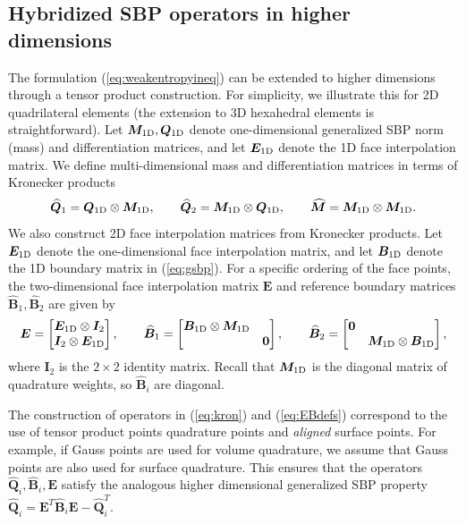 \documentclass{svjour3}                     %
\renewcommand{\hat}{\widehat}
\begin{document}
\subsection{Hybridized SBP operators in higher dimensions}

The formulation (\ref{eq:weakentropyineq}) can be extended to higher dimensions through a tensor product construction.  For simplicity, we illustrate this for 2D quadrilateral elements (the extension to 3D hexahedral elements is straightforward).  Let $\bm{M}_{\rm 1D}, \bm{Q}_{\rm 1D}$ denote one-dimensional generalized SBP norm (mass) and differentiation matrices, and let $\bm{E}_{\rm 1D}$ denote the 1D face interpolation matrix.  We define multi-dimensional  mass and differentiation matrices in terms of Kronecker products  
\begin{equation}
\hat{\bm{Q}}_1 = \bm{Q}_{\rm 1D} \otimes \bm{M}_{\rm 1D}, \qquad \hat{\bm{Q}}_2  = \bm{M}_{\rm 1D} \otimes \bm{Q}_{\rm 1D}, \qquad \hat{\bm{M}} = \bm{M}_{\rm 1D} \otimes  \bm{M}_{\rm 1D}.
\label{eq:kron}
\end{equation}
We also construct 2D face interpolation matrices from Kronecker products.  Let $\bm{E}_{\rm 1D}$ denote the one-dimensional face interpolation matrix, and let $\bm{B}_{\rm 1D}$ denote the 1D boundary matrix in (\ref{eq:gsbp}).  For a specific ordering of the face points, the two-dimensional face interpolation matrix $\bm{E}$ and reference boundary matrices $\hat{\bm{B}}_1, \hat{\bm{B}}_2$ are given by
\begin{equation}
\bm{E} = \begin{bmatrix}
\bm{E}_{\rm 1D} \otimes \bm{I}_{2}\\
\bm{I}_{2} \otimes \bm{E}_{\rm 1D} 
\end{bmatrix}, \qquad 
\hat{\bm{B}}_1 = \begin{bmatrix}
\bm{B}_{\rm 1D} \otimes \bm{M}_{\rm 1D} & \\
& \bm{0}
\end{bmatrix}, \qquad 
\hat{\bm{B}}_2 = \begin{bmatrix}
\bm{0} &\\
& \bm{M}_{\rm 1D} \otimes \bm{B}_{\rm 1D} 
\end{bmatrix},
\label{eq:EBdefs}
\end{equation}
where $\bm{I}_2$ is the $2\times 2$ identity matrix.  Recall that $\bm{M}_{\rm 1D}$ is the diagonal matrix of quadrature weights, so $\hat{\bm{B}}_i$ are diagonal.  

The construction of operators in (\ref{eq:kron}) and (\ref{eq:EBdefs}) correspond to the use of tensor product points quadrature points and \emph{aligned} surface points.  For example, if Gauss points are used for volume quadrature, we assume that Gauss points are also used for surface quadrature.  This ensures that the operators $\hat{\bm{Q}}_i, \hat{\bm{B}}_i, \bm{E}$ satisfy the analogous higher dimensional generalized SBP property $\hat{\bm{Q}}_i = \bm{E}^T\hat{\bm{B}}_i\bm{E} - \hat{\bm{Q}}_i^T$.
\end{document}

